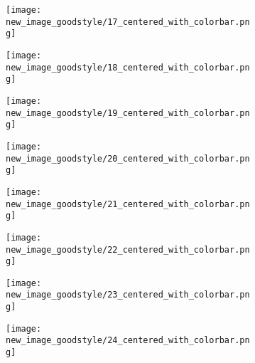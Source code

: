 \documentclass[a4paper,12pt]{article}
\begin{document}
\begin{figure}[H]
  \begin{subfigure}{0.11\textwidth}
    \texttt{[image: new\_image\_goodstyle/17\_centered\_with\_colorbar.png]}
  \end{subfigure}
  \hfill
  \begin{subfigure}{0.11\textwidth}
    \texttt{[image: new\_image\_goodstyle/18\_centered\_with\_colorbar.png]}
  \end{subfigure}
  \hfill
  \begin{subfigure}{0.11\textwidth}
    \texttt{[image: new\_image\_goodstyle/19\_centered\_with\_colorbar.png]}
  \end{subfigure}
  \hfill
  \begin{subfigure}{0.11\textwidth}
    \texttt{[image: new\_image\_goodstyle/20\_centered\_with\_colorbar.png]}
  \end{subfigure}
  \hfill
  \begin{subfigure}{0.11\textwidth}
    \texttt{[image: new\_image\_goodstyle/21\_centered\_with\_colorbar.png]}
  \end{subfigure}
  \hfill
  \begin{subfigure}{0.11\textwidth}
    \texttt{[image: new\_image\_goodstyle/22\_centered\_with\_colorbar.png]}
  \end{subfigure}
  \hfill
  \begin{subfigure}{0.11\textwidth}
    \texttt{[image: new\_image\_goodstyle/23\_centered\_with\_colorbar.png]}
  \end{subfigure}
  \hfill
  \begin{subfigure}{0.11\textwidth}
    \texttt{[image: new\_image\_goodstyle/24\_centered\_with\_colorbar.png]}
  \end{subfigure}
  \hfill
\end{figure}
\end{document}
